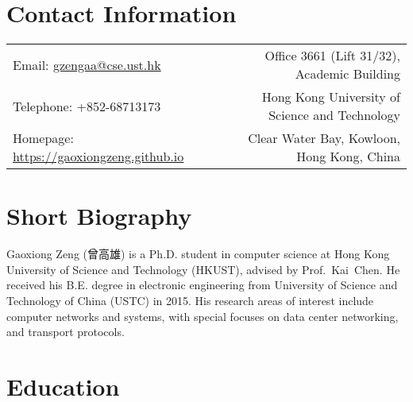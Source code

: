 \documentclass[10pt,a4paper,roman]{moderncv} %
\begin{document}
\makecvtitle %

\section{Contact Information}
\vspace{2mm}
\begin{tabular}{p{} r}
Email: \href{mailto:gzengaa@cse.ust.hk}{gzengaa@cse.ust.hk} &  Office 3661 (Lift 31/32), Academic Building\\
Telephone: +852-68713173 & Hong Kong University of Science and Technology\\
Homepage: \textcolor{blue}{\url{https://gaoxiongzeng.github.io}} & Clear Water Bay, Kowloon, Hong Kong, China\\
\end{tabular}


\section{Short Biography}
\vspace{2mm}
Gaoxiong Zeng (曾高雄) is a Ph.D. student in computer science at Hong Kong University of Science and Technology (HKUST), advised by Prof.~Kai~Chen. He received his B.E. degree in electronic engineering from University of Science and Technology of China (USTC) in 2015. His research areas of interest include computer networks and systems, with special focuses on data center networking, and transport protocols.

\section{Education}
\vspace{2mm}
\vspace{2mm}
\end{document}

